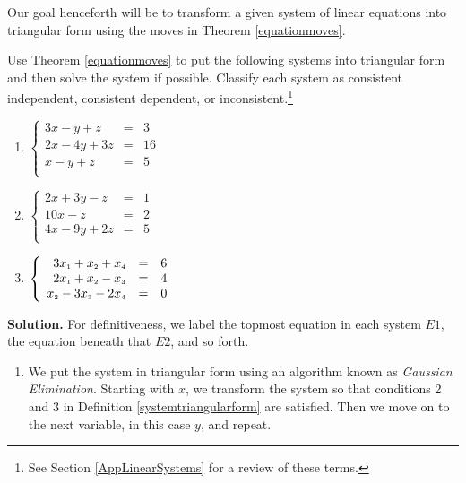 Our goal henceforth will be to transform a given system of linear equations into triangular form using the moves in Theorem \ref{equationmoves}.

\begin{ex} \label{GaussEqnEx} Use Theorem \ref{equationmoves} to put the following systems into triangular form and then solve the system if possible.  Classify each system as consistent independent, consistent dependent, or inconsistent.\footnote{See Section \ref{AppLinearSystems} for a review of these terms.}

\begin{multicols}{3}

\begin{enumerate}

\item  $\left\{ \begin{array}{rcr} 3x-y+z & = & 3 \\ 2x-4y+3z & = & 16 \\ x-y+z & = & 5 \\ \end{array} \right.$

\item  $\left\{ \begin{array}{rcr} 2x+3y-z & = & 1 \\ 10x-z & = & 2 \\ 4x-9y+2z & = & 5 \\ \end{array} \right.$

\item  $\left\{ \begin{array}{rcr} 3x_{\mbox{\tiny$1$}} +x_{\mbox{\tiny$2$}} + x_{\mbox{\tiny$4$}} & = & 6 \\ 2x_{\mbox{\tiny$1$}} + x_{\mbox{\tiny$2$}} -x_{\mbox{\tiny$3$}}  & = & 4  \\  x_{\mbox{\tiny$2$}} -3x_{\mbox{\tiny$3$}} -2x_{\mbox{\tiny$4$}} & = & 0 \end{array} \right.$

\end{enumerate}

\end{multicols}

{\bf Solution.}  For definitiveness, we label the topmost equation in each system $E1$, the equation beneath that $E2$, and so forth. 

\begin{enumerate}

\item We put the system in triangular form using an algorithm known as  \textit{Gaussian Elimination}.  Starting with $x$, we transform the system so that conditions 2 and 3 in Definition \ref{systemtriangularform} are satisfied.  Then we move on to the next variable, in this case $y$, and repeat.  


\end{enumerate}
\end{ex}
